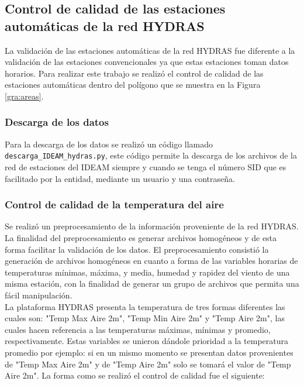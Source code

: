 \subsection{Control de calidad de las estaciones automáticas de la red HYDRAS}

La validación de las estaciones automáticas de la red HYDRAS fue diferente a la validación de las estaciones convencionales ya que estas estaciones toman datos horarios. Para realizar este trabajo se realizó el control de calidad de las estaciones automáticas dentro del polígono que se muestra en la Figura \ref{gra:areas}.

\subsubsection{Descarga de los datos}
Para la descarga de los datos se realizó un código llamado \texttt{descarga\_IDEAM\_hydras.py}, este código permite la descarga de los archivos de la red de estaciones del IDEAM siempre y cuando se tenga el número SID que es facilitado por la entidad, mediante un usuario y una contraseña.

\subsubsection{Control de calidad de la temperatura del aire}

Se realizó un preprocesamiento de la información proveniente de la red HYDRAS. La finalidad del preprocesamiento es generar archivos homogéneos y de esta forma facilitar la validación de los datos. El preprocesamiento consistió la generación de archivos homogéneos en cuanto a forma de las variables horarias de temperaturas mínimas, máxima, y media, humedad y rapidez del viento de una misma estación, con la finalidad de generar un grupo de archivos que permita una fácil manipulación.\\

La plataforma HYDRAS presenta la temperatura de tres formas diferentes las cuales son: "Temp Max Aire 2m", "Temp Min Aire 2m" y "Temp Aire 2m", las cuales hacen referencia a las temperaturas máximas, mínimas y promedio, respectivamente. Estas variables se unieron dándole prioridad a la temperatura promedio por ejemplo: si en un mismo momento se presentan datos provenientes de "Temp Max Aire 2m" y de "Temp Aire 2m" solo se tomará el valor de "Temp Aire 2m". La forma como se realizó el control de calidad fue el siguiente:


